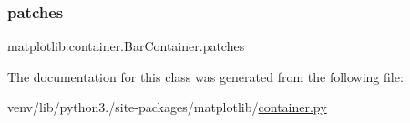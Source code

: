\subsubsection{\texorpdfstring{patches}{patches}}
{\footnotesize\ttfamily matplotlib.\+container.\+Bar\+Container.\+patches}



The documentation for this class was generated from the following file\+:\begin{DoxyCompactItemize}
\item 
venv/lib/python3./site-\/packages/matplotlib/\hyperlink{container_8py}{container.\+py}\end{DoxyCompactItemize}
